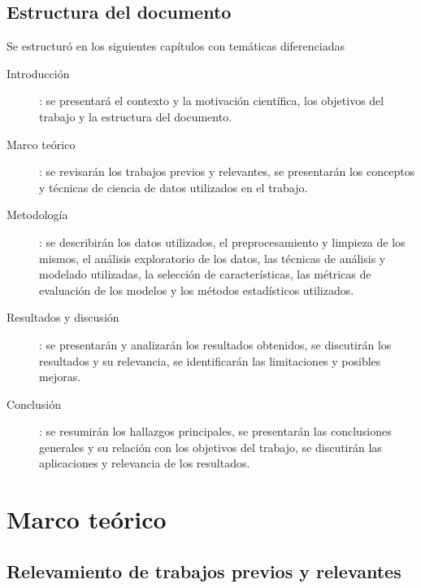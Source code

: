\documentclass[a4paper]{report}
\begin{document}
\section{Estructura del documento}

Se estructuró en los siguientes capítulos con temáticas diferenciadas
\begin{description}
	\item[Introducción]: se presentará el contexto y la motivación científica, los objetivos del trabajo y la estructura del documento.
	\item[Marco teórico]: se revisarán los trabajos previos y relevantes, se presentarán los conceptos y técnicas de ciencia de datos utilizados en el trabajo.
	\item[Metodología]: se describirán los datos utilizados, el preprocesamiento y limpieza de los mismos, el análisis exploratorio de los datos, las técnicas de análisis y modelado utilizadas, la selección de características, las métricas de evaluación de los modelos y los métodos estadísticos utilizados.
	\item[Resultados y discusión]: se presentarán y analizarán los resultados obtenidos, se discutirán los resultados y su relevancia, se identificarán las limitaciones y posibles mejoras.
	\item[Conclusión]: se resumirán los hallazgos principales, se presentarán las conclusiones generales y su relación con los objetivos del trabajo, se discutirán las aplicaciones y relevancia de los resultados.
\end{description}



\chapter{Marco teórico}


\section{Relevamiento de trabajos previos y relevantes}
\end{document}
